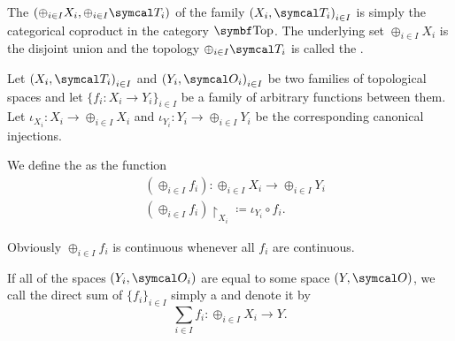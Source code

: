 \begin{definition}\label{def:topological_sum}\cite[74]{Engelking1989}
  The  \( (\oplus_{i \in I} X_i, \oplus_{i \in I} \Cal{T}_i) \) of the family \( { (X_i, \Cal{T}_i) }_{i \in I} \) is simply the categorical coproduct in the category \( \Bold{Top} \). The underlying set \( \oplus_{i \in I} X_i \) is the disjoint union and the topology \( \oplus_{i \in I} \Cal{T}_i \) is called the .

  Let \( { (X_i, \Cal{T}_i) }_{i \in I} \) and \( { (Y_i, \Cal{O}_i) }_{i \in I} \) be two families of topological spaces and let \( \{ f_i: X_i \to Y_i \}_{i \in I} \) be a family of arbitrary functions between them. Let \( \iota_{X_i}: X_i \to \oplus_{i \in I} X_i \) and \( \iota_{Y_i}: Y_i \to \oplus_{i \in I} Y_i \) be the corresponding canonical injections.

  We define the  as the function
  \begin{align*}
    &(\oplus_{i \in I} f_i): \oplus_{i \in I} X_i \to \oplus_{i \in I} Y_i \\
    &(\oplus_{i \in I} f_i){\restriction}_{X_i} \coloneqq \iota_{Y_i} \circ f_i.
  \end{align*}

  Obviously \( \oplus_{i \in I} f_i \) is continuous whenever all \( f_i \) are continuous.

  If all of the spaces \( (Y_i, \Cal{O}_i) \) are equal to some space \( (Y, \Cal{O}) \), we call the direct sum of \( \{ f_i \}_{i \in I} \) simply a  and denote it by
  \begin{equation*}
    \sum_{i \in I} f_i: \oplus_{i \in I} X_i \to Y.
  \end{equation*}
\end{definition}
